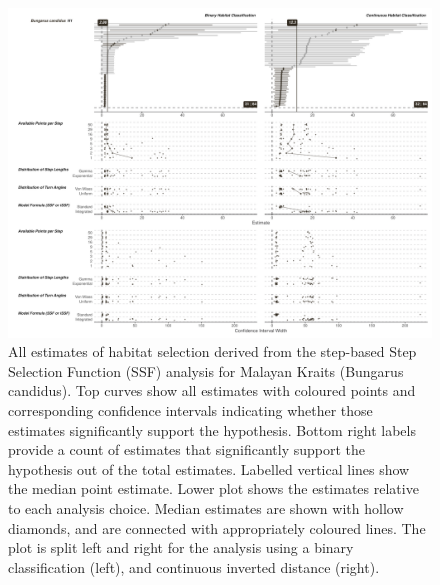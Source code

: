 \documentclass[10pt,a4paper]{article}
\begin{document}
\begin{figure}
\includegraphics[width=1\linewidth]{../../figures/specCurve_Bungarus candidus_ssf} \caption{All estimates of habitat selection derived from the step-based Step Selection Function (SSF) analysis for Malayan Kraits (Bungarus candidus). Top curves show all estimates with coloured points and corresponding confidence intervals indicating whether those estimates significantly support the hypothesis. Bottom right labels provide a count of estimates that significantly support the hypothesis out of the total estimates. Labelled vertical lines show the median point estimate. Lower plot shows the estimates relative to each analysis choice. Median estimates are shown with hollow diamonds, and are connected with appropriately coloured lines. The plot is split left and right for the analysis using a binary classification (left), and continuous inverted distance (right).}\label{fig:specCurveSsfBUCA}
\end{figure}
\end{document}
